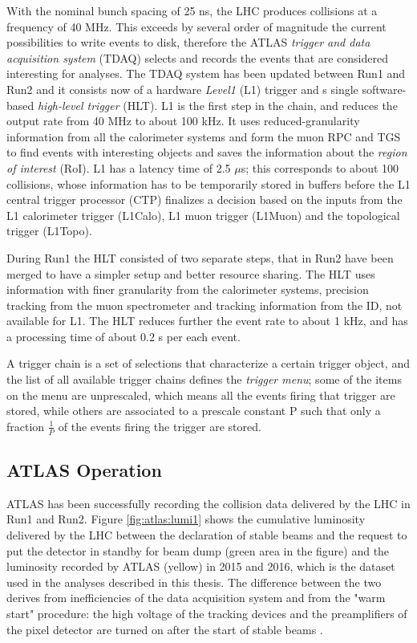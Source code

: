 With the nominal bunch spacing of 25 ns, the LHC produces collisions at a frequency of 40 MHz. This exceeds by several order of magnitude the current possibilities to write events to disk, therefore the ATLAS \textit{trigger and data acquisition system} (TDAQ) selects and records the events that are considered interesting for analyses. The TDAQ system has been updated between Run1 and Run2 \cite{Aaboud:2016leb} and it consists now of a  hardware \textit{Level1} (L1) trigger and s single software-based \textit{high-level trigger} (HLT). L1 is the first step in the chain, and reduces the output rate from 40 MHz to about 100 kHz. It uses reduced-granularity information from all the calorimeter systems and form the muon RPC and TGS to find events with interesting objects and saves the information about the \textit{region of interest} (RoI). L1 has a latency time of 2.5 $\mu$s; this corresponds to about 100 collisions, whose information has to be temporarily stored in buffers before the L1 central trigger processor (CTP) finalizes a decision based on the inputs from the L1 calorimeter trigger (L1Calo), L1 muon trigger (L1Muon) and the topological trigger (L1Topo). 

During Run1 the HLT consisted of two separate steps, that in Run2 have been merged to have a simpler setup and better resource sharing. The HLT uses information with finer granularity from the calorimeter systems, precision tracking from the muon spectrometer and tracking information from the ID, not available for L1. The HLT reduces further the event rate to about 1 kHz, and has a processing time of about 0.2 s per each event. 

A trigger chain is a set of selections that characterize a certain trigger object, and the list of all available trigger chains defines the \textit{trigger menu}; some of the items on the menu are unprescaled, which means all the events firing that trigger are stored, while others are associated to a prescale constant P such that only a fraction $\frac{1}{P}$ of the events firing the trigger are stored.

\subsection{ATLAS Operation}

ATLAS has been successfully recording the collision data delivered by the LHC in Run1 and Run2. Figure \ref{fig:atlas:lumi1} shows the cumulative luminosity delivered by the LHC between the declaration of stable beams and the request to put the detector in standby for beam dump (green area in the figure) and the luminosity recorded by ATLAS (yellow) in 2015 and 2016, which is the dataset used in the analyses described in this thesis. The difference between the two derives from inefficiencies of the data acquisition system and from the "warm start" procedure: the high voltage of the tracking devices and the preamplifiers of the pixel detector are turned on after the start of stable beams \cite{LumiTwiki}.

